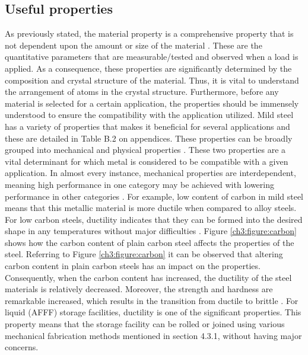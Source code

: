 \documentclass[12pt]{report}
\begin{document}
\subsection{Useful properties} 
As previously stated, the material property is a comprehensive property that is not dependent upon the amount or size of the material \cite{kabir2020critical}. These are the quantitative parameters that are measurable/tested and observed when a load is applied. As a consequence, these properties are significantly determined by the composition and crystal structure of the material. Thus, it is vital to understand the arrangement of atoms in the crystal structure. Furthermore, before any material is selected for a certain application, the properties should be immensely understood to ensure the compatibility with the application utilized.
Mild steel has a variety of properties that makes it beneficial for several applications and these are detailed in Table B.2 on appendices. These properties can be broadly grouped into mechanical and physical properties \cite{kabir2020critical}. These two properties are a vital determinant for which metal is considered to be compatible with a given application. In almost every instance, mechanical properties are interdependent, meaning high performance in one category may be achieved with lowering performance in other categories \cite{kabir2020critical}. For example, low content of carbon in mild steel means that this metallic material is more ductile when compared to alloy steels. 
For low carbon steels, ductility indicates that they can be formed into the desired shape in any temperatures without major difficulties \cite{dong2005deformation}. Figure \ref{ch3:figure:carbon} shows how the carbon content of plain carbon steel affects the properties of the steel. Referring to Figure \ref{ch3:figure:carbon} it can be observed that altering carbon content in plain carbon steels has an impact on the properties. Consequently, when the carbon content has increased, the ductility of the steel materials is relatively decreased. Moreover, the strength and hardness are remarkable increased, which results in the transition from ductile to brittle \cite{abou2001mechanical}. For liquid (AFFF) storage facilities, ductility is one of the significant properties. This property means that the storage facility can be rolled or joined using various mechanical fabrication methods mentioned in section 4.3.1, without having major concerns.
 
\end{document}
